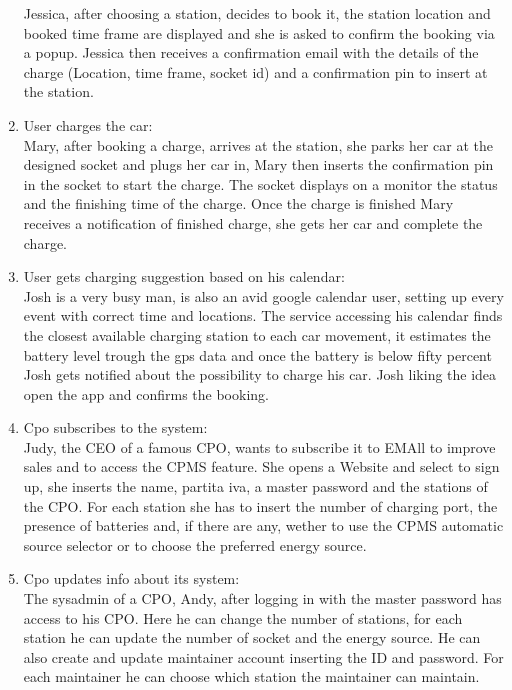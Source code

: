 \begin{enumerate}[label=S\arabic*]
            Jessica, after choosing a station, decides to book it, the station location and booked time frame are displayed
            and she is asked to confirm the booking via a popup. Jessica then receives a confirmation email with the details
            of the charge (Location, time frame, socket id) and a confirmation pin to insert at the station.
      \item User charges the car:\\
            Mary, after booking a charge, arrives at the station, she parks her car at the designed socket
            and plugs her car in, Mary then inserts the confirmation pin in the socket to start the charge.
            The socket displays on a monitor the status and the finishing time of the charge.
            Once the charge is finished Mary receives a notification of finished charge,
            she gets her car and complete the charge.
      \item User gets charging suggestion based on his calendar:\\
            Josh is a very busy man, is also an avid google calendar user,
            setting up every event with correct time and locations.
            The service accessing his calendar finds the closest available charging station to each car movement,
            it estimates the battery level trough the gps data and once the battery is below fifty percent Josh gets notified
            about the possibility to charge his car.
            Josh liking the idea open the app and confirms the booking.
      \item Cpo subscribes to the system:\\
            Judy, the CEO of a famous CPO, wants to subscribe it to EMAll to improve sales and to access the CPMS feature.
            She opens a Website and select to sign up, she inserts the name, partita iva, a master password and the stations of the CPO.
            For each station she has to insert the number of charging port, the presence of batteries and, if there are any,
            wether to use the CPMS automatic source selector or to choose the preferred energy source.
      \item Cpo updates info about its system:\\
            The sysadmin of a CPO, Andy, after logging in with the master password has access to his CPO.
            Here he can change the number of stations, for each station he can update the number of socket and the energy source.
            He can also create and update maintainer account inserting the ID and password. For each maintainer he can choose which station the maintainer can maintain.

\end{enumerate}

